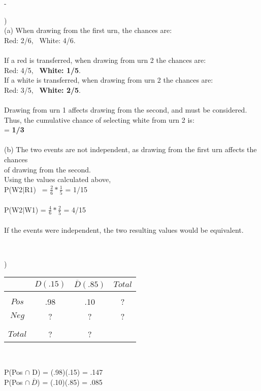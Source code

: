 -\documentclass[12pt]{article}
\begin{document}
)\\
\indent (a) When drawing from the first urn, the chances are:\\
\indent \indent Red: 2/6, \ White: 4/6.\\\\
\indent \indent If a red is transferred, when drawing from urn 2 the chances are: \\
\indent \indent Red: 4/5, \ \textbf{White: 1/5}.\\
\indent \indent If a white is transferred, when drawing from urn 2 the chances are: \\
\indent \indent Red: 3/5, \ \textbf{White: 2/5}.\\\\
\indent \indent Drawing from urn 1 affects drawing from the second, and must be considered.\\
\indent \indent Thus, the cumulative chance of selecting white from urn 2 is:\\ 
\indent {} = \textbf{1/3}\\\\

\indent (b) The two events are not independent, as drawing from the first urn affects the chances\\
\indent \indent  of drawing from the second.\\
\indent \indent Using the values calculated above, \\
\indent \indent P(W2$|$R1) \ = {\Large$ \frac{2}{6}*\frac{1}{5}$} = 1/15\\\\
\indent \indent P(W2$|$W1) = {\Large$ \frac{4}{6}*\frac{2}{5}$} = 4/15\\\\
\indent \indent If the events were independent, the two resulting values would be equivalent.


\noindent \hrulefill \\

\begin{multicols}{2}
)
\begin{tabular}{c|cc|c}
 & $D(.15)$ & $\overline{D}(.85)$ & $Total$ \\
 \hline &&&\\[-1em]
$Pos$ & .98 & .10 & ?\\
$Neg$ & ? & ? & ?\\
 \hline &&&\\[-1em]
 $Total$ & ? & ? & 
\end{tabular}\\

\columnbreak 

\hfill \break
\noindent P(Pos $\cap$ D) = (.98)(.15) = .147\\
P(Pos $\cap \ \overline{D}$) = (.10)(.85) = .085\\

\end{multicols}
\end{document}
